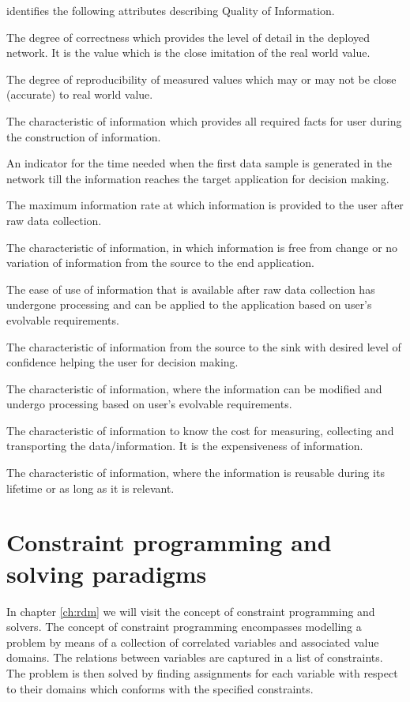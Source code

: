 \cite{qoi_definition} identifies the following attributes describing Quality of Information.
\begin{description}
\nospace
\item[Accuracy] The degree of correctness which provides the level of detail in the deployed network. It is the value which is the close imitation of the real world value.
\item[Precision] The degree of reproducibility of measured values which may or may not be close (accurate) to real world value.
\item[Completeness] The characteristic of information which provides all required facts for user during the construction of information.
\item[Timeliness] An indicator for the time needed when the first data sample is generated in the network till the information reaches the target application for decision making.
\item[Throughput] The maximum information rate at which information is provided to the user after raw data collection.
\item[Reliability] The characteristic of information, in which information is free from change or no variation of information from the source to the end application.
\item[Usability] The ease of use of information that is available after raw data collection has undergone processing and can be applied to the application based on user's evolvable requirements.
\item[Certainty] The characteristic of information from the source to the sink with desired level
of confidence helping the user for decision making.
\item[Tunability] The characteristic of information, where the information can be modified and undergo processing based on user's evolvable requirements.
\item[Affordability] The characteristic of information to know the cost for measuring, collecting and
transporting the data/information. It is the expensiveness of information. 
\item[Reusability] The characteristic of information, where the information is reusable during its lifetime or as long as it is relevant.
\end{description}
\section{Constraint programming and solving paradigms}
\label{sec:back:constraint}
In chapter \ref{ch:rdm} we will visit the concept of constraint programming and solvers. The concept of constraint programming encompasses modelling a problem by means of a collection of correlated variables and associated value domains. The relations between variables are captured in a list of constraints. The problem is then solved by finding assignments for each variable with respect to their domains which conforms with the specified constraints. 

